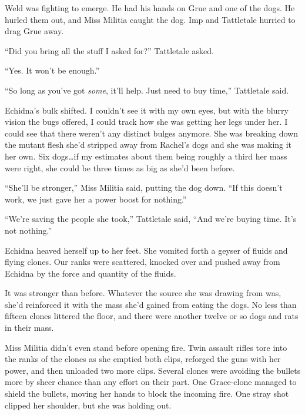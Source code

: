 Weld was fighting to emerge.  He had his hands on Grue and one of the dogs.  He hurled them out, and Miss Militia caught the dog.  Imp and Tattletale hurried to drag Grue away.



``Did you bring all the stuff I asked for?'' Tattletale asked.



``Yes.  It won't be enough.''



``So long as you've got \emph{some}, it'll help.  Just need to buy time,'' Tattletale said.



Echidna's bulk shifted.  I couldn't see it with my own eyes, but with the blurry vision the bugs offered, I could track how she was getting her legs under her.  I could see that there weren't any distinct bulges anymore.  She was breaking down the mutant flesh she'd stripped away from Rachel's dogs and she was making it her own.  Six dogs\ldots if my estimates about them being roughly a third her mass were right, she could be three times as big as she'd been before.



``She'll be stronger,'' Miss Militia said, putting the dog down.  ``If this doesn't work, we just gave her a power boost for nothing.''



``We're saving the people she took,'' Tattletale said, ``And we're buying time.  It's not nothing.''



Echidna heaved herself up to her feet.  She vomited forth a geyser of fluids and flying clones.  Our ranks were scattered, knocked over and pushed away from Echidna by the force and quantity of the fluids.



It was stronger than before.  Whatever the source she was drawing from was, she'd reinforced it with the mass she'd gained from eating the dogs.  No less than fifteen clones littered the floor, and there were another twelve or so dogs and rats in their mass.



Miss Militia didn't even stand before opening fire.  Twin assault rifles tore into the ranks of the clones as she emptied both clips, reforged the guns with her power, and then unloaded two more clips.  Several clones were avoiding the bullets more by sheer chance than any effort on their part.  One Grace-clone managed to shield the bullets, moving her hands to block the incoming fire.  One stray shot clipped her shoulder, but she was holding out.



